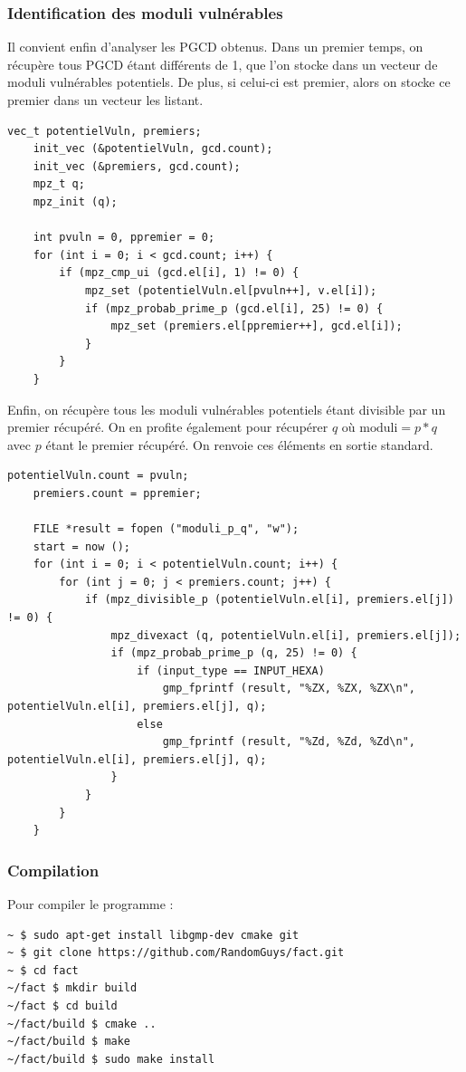 \subsubsection{Identification des moduli vulnérables}
Il convient enfin d'analyser les PGCD obtenus. Dans un premier temps, on récupère tous PGCD étant différents de 1, que l'on stocke dans un vecteur de moduli vulnérables potentiels. De plus, si celui-ci est premier, alors on stocke ce premier dans un vecteur les listant. 

\begin{lstlisting}[style=customc,caption=fact\_superspeed.c - partie 5a, label=fact5]
	vec_t potentielVuln, premiers;
	init_vec (&potentielVuln, gcd.count);
	init_vec (&premiers, gcd.count);
	mpz_t q;
	mpz_init (q);
	
	int pvuln = 0, ppremier = 0;
	for (int i = 0; i < gcd.count; i++) {
		if (mpz_cmp_ui (gcd.el[i], 1) != 0) {
			mpz_set (potentielVuln.el[pvuln++], v.el[i]);
			if (mpz_probab_prime_p (gcd.el[i], 25) != 0) {
				mpz_set (premiers.el[ppremier++], gcd.el[i]);
			}
		}
	}
\end{lstlisting}


Enfin, on récupère tous les moduli vulnérables potentiels étant divisible par un premier récupéré. On en profite également pour récupérer $q$ où $\text{moduli}=p*q$ avec $p$ étant le premier récupéré. On renvoie ces éléments en sortie standard. 
\begin{lstlisting}[style=customc,caption=fact\_superspeed.c - partie 5b, label=fact5]
    	potentielVuln.count = pvuln;
	premiers.count = ppremier;

	FILE *result = fopen ("moduli_p_q", "w");
	start = now ();
	for (int i = 0; i < potentielVuln.count; i++) {
		for (int j = 0; j < premiers.count; j++) {
			if (mpz_divisible_p (potentielVuln.el[i], premiers.el[j]) != 0) {
				mpz_divexact (q, potentielVuln.el[i], premiers.el[j]);
				if (mpz_probab_prime_p (q, 25) != 0) {
					if (input_type == INPUT_HEXA) 
						gmp_fprintf (result, "%ZX, %ZX, %ZX\n", potentielVuln.el[i], premiers.el[j], q);
					else
						gmp_fprintf (result, "%Zd, %Zd, %Zd\n", potentielVuln.el[i], premiers.el[j], q);
				}
			}
		}
	}

\end{lstlisting}






\subsubsection{Compilation}
Pour compiler le programme :
\begin{verbatim}
~ $ sudo apt-get install libgmp-dev cmake git 
~ $ git clone https://github.com/RandomGuys/fact.git
~ $ cd fact
~/fact $ mkdir build
~/fact $ cd build
~/fact/build $ cmake ..
~/fact/build $ make
~/fact/build $ sudo make install
\end{verbatim}

